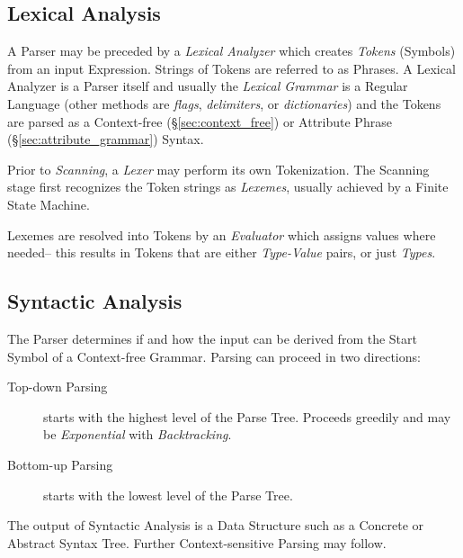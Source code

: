 \subsection{Lexical Analysis}

A Parser may be preceded by a \emph{Lexical Analyzer} which creates
\emph{Tokens} (Symbols) from an input Expression. Strings of Tokens
are referred to as Phrases. A Lexical Analyzer is a Parser itself and
usually the \emph{Lexical Grammar} is a Regular Language (other
methods are \emph{flags}, \emph{delimiters}, or \emph{dictionaries})
and the Tokens are parsed as a Context-free
(\S\ref{sec:context_free}) or Attribute Phrase
(\S\ref{sec:attribute_grammar}) Syntax.

Prior to \emph{Scanning}, a \emph{Lexer} may perform its own
Tokenization. The Scanning stage first recognizes the Token
strings as \emph{Lexemes}, usually achieved by a Finite State
Machine.

Lexemes are resolved into Tokens by an \emph{Evaluator} which assigns
values where needed-- this results in Tokens that are either
\emph{Type-Value} pairs, or just \emph{Types}.



\subsection{Syntactic Analysis}

The Parser determines if and how the input can be derived from the
Start Symbol of a Context-free Grammar. Parsing can proceed in two
directions:
\begin{description}
    \item [Top-down Parsing] starts with the highest level of the Parse
      Tree. Proceeds greedily and may be \emph{Exponential} with
      \emph{Backtracking}.
    \item [Bottom-up Parsing] starts with the lowest level of the
      Parse Tree.
\end{description}
The output of Syntactic Analysis is a Data Structure such as a
Concrete or Abstract Syntax Tree. Further Context-sensitive Parsing
may follow.



